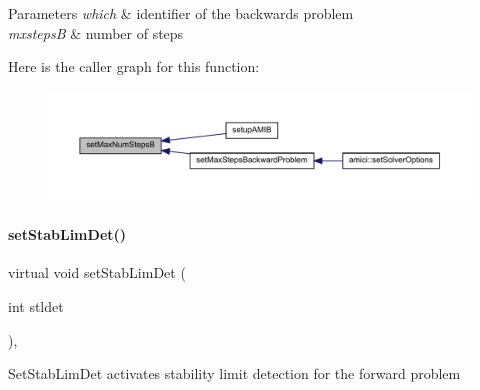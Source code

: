 \begin{DoxyParams}{Parameters}
{\em which} & identifier of the backwards problem \\
\hline
{\em mxstepsB} & number of steps \\
\hline
\end{DoxyParams}
Here is the caller graph for this function\+:
\nopagebreak
\begin{figure}[H]
\begin{center}
\leavevmode
\includegraphics[width=350pt]{classamici_1_1_solver_a1163fddb222195354bdcf306fc52a1d0_icgraph}
\end{center}
\end{figure}
\mbox{\label{classamici_1_1_solver_a040fb365c47a8e8ccc1f32021b38bfcb}} 
\paragraph{\texorpdfstring{set\+Stab\+Lim\+Det()}{setStabLimDet()}}
{\footnotesize\ttfamily virtual void set\+Stab\+Lim\+Det (\begin{DoxyParamCaption}\item[{int}]{stldet }\end{DoxyParamCaption})\hspace{0.3cm}{\ttfamily [protected]}, {}}

Set\+Stab\+Lim\+Det activates stability limit detection for the forward problem


